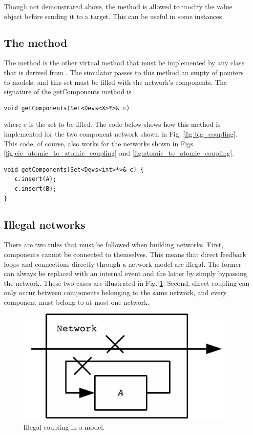 Though not demonstrated above, the  method is allowed to modify the value object before sending it to a target. This can be useful in some instances.

\subsection{The  method}
The  method is the other virtual method that must be implemented by any class that is derived from . The simulator passes to this method an empty  of pointers to models, and this set must be filled with the network's components. The signature of the getComponents method is
\begin{verbatim}
void getComponents(Set<Devs<X>*>& c) 
\end{verbatim}
where c is the set to be filled. The code below shows how this method is implemented for the two component network shown in Fig. \ref{fig:big_coupling}. This code, of course, also works for the networks shown in Figs. \ref{fig:eic_atomic_to_atomic_coupling} and \ref{fig:atomic_to_atomic_coupling}.
\begin{verbatim}
void getComponents(Set<Devs<int>*>& c) { 
   c.insert(A);
   c.insert(B);
}
\end{verbatim}

\subsection{Illegal networks}
There are two rules that must be followed when building networks. First, components cannot be connected to themselves. This means that direct feedback loops and connections directly through a network model are illegal. The former can always be replaced with an internal event and the latter by simply bypassing the network. These two cases are illustrated in Fig. \ref{fig:bad_coupling}. Second, direct coupling can only occur between components belonging to the same network, and every component must belong to at most one network. 
\begin{figure}[ht]
\centering
\includegraphics{network_models_figs/bad_couplings.pdf}
\caption{Illegal coupling in a  model.}
\label{fig:bad_coupling}
\end{figure}


